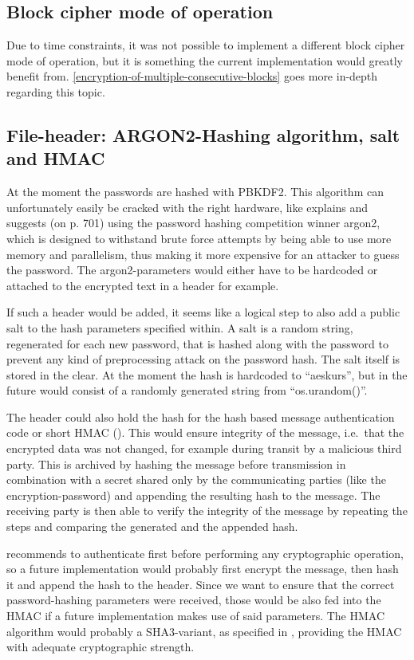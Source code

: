 \hypertarget{block-cipher-mode-of-operation}{%
\subsection{Block cipher mode of
operation}\label{block-cipher-mode-of-operation}}

Due to time constraints, it was not possible to implement a different
block cipher mode of operation, but it is something the current
implementation would greatly benefit from. \ref{encryption-of-multiple-consecutive-blocks} goes more
in-depth regarding this topic.

\hypertarget{file-header-argon2-hashing-algorithm-salt-and-hmac}{%
\subsection{File-header: ARGON2-Hashing algorithm, salt and
HMAC}\label{file-header-argon2-hashing-algorithm-salt-and-hmac}}

At the moment the passwords are hashed with PBKDF2. This algorithm can
unfortunately easily be cracked with the right hardware, like \cite[p. 697]{appcrypt} explains and suggests (on p. 701) using the password hashing
competition winner argon2, which is designed to withstand brute force
attempts by being able to use more memory and parallelism, thus making it
more expensive for an attacker to guess the password. The
argon2-parameters would either have to be hardcoded or attached to the
encrypted text in a header for example.

If such a header would be added, it seems like a logical step to also
add a public salt to the hash parameters specified within. A salt is a
random string, regenerated for each new password, that is hashed along
with the password to prevent any kind of preprocessing attack on the
password hash. The salt itself is stored in the clear. \cite[p. 693]{appcrypt} At
the moment the hash is hardcoded to ``aeskurs'', but in the future would
consist of a randomly generated string from ``os.urandom()''.

The header could also hold the hash for the hash based message
authentication code or short HMAC (\cite[ch. 12.2.3]{paar}). This would ensure
integrity of the message, i.e.~that the encrypted data was not changed,
for example during transit by a malicious third party. This is archived
by hashing the message before transmission in combination with a secret
shared only by the communicating parties (like the encryption-password)
and appending the resulting hash to the message. The receiving party is
then able to verify the integrity of the message by repeating the steps
and comparing the generated and the appended hash.

\cite{moxie} recommends to authenticate first before performing any
cryptographic operation, so a future implementation would probably first
encrypt the message, then hash it and append the hash to the header.
Since we want to ensure that the correct password-hashing parameters
were received, those would be also fed into the HMAC if a future
implementation makes use of said parameters. The HMAC algorithm would
probably a SHA3-variant, as specified in \cite{fips202}, providing the HMAC
with adequate cryptographic strength.
